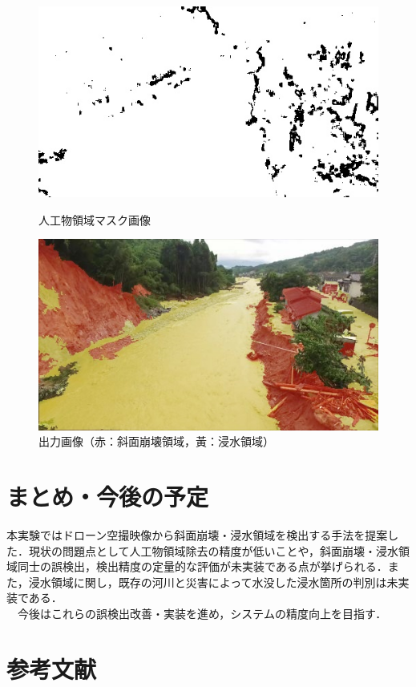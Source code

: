 \documentclass[a4paper, twocolumn, xelatex, 10pt, ja=standard, Ligatures=TeX]{bxjsarticle}
\begin{document}
		\begin{figure}[t]
			\begin{minipage}{0.48\hsize}
				\centering
				\includegraphics[width=\linewidth]{img/maskArtifact.jpg}
				\caption{人工物領域マスク画像}
				\label{img07}
			\end{minipage}
			\begin{minipage}{0.48\hsize}
				\centering
				\includegraphics[width=\linewidth]{img/result.jpg}
				\caption{出力画像（赤：斜面崩壊領域，黃：浸水領域）}
				\label{img08}
			\end{minipage}
		\end{figure}

	
	\section{まとめ・今後の予定}
		本実験ではドローン空撮映像から斜面崩壊・浸水領域を検出する手法を提案した．現状の問題点として人工物領域除去の精度が低いことや，斜面崩壊・浸水領域同士の誤検出，検出精度の定量的な評価が未実装である点が挙げられる．また，浸水領域に関し，既存の河川と災害によって水没した浸水箇所の判別は未実装である．\\
		　今後はこれらの誤検出改善・実装を進め，システムの精度向上を目指す．

	\section{参考文献}
		

\end{document}
